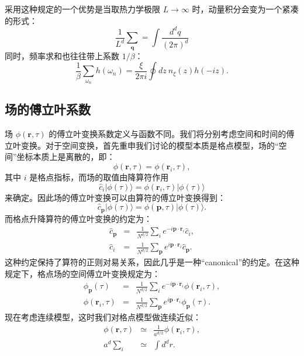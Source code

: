 \documentclass[UTF8]{ctexart}
\begin{document}
采用这种规定的一个优势是当取热力学极限 $L \rightarrow \infty$ 时，动量积分会变为一个紧凑的形式：
\begin{equation}
	\frac{1}{L^d}\sum_{\bm q} = \int \frac{d^d q}{(2\pi)^d}
\end{equation}
同时，频率求和也往往带上系数 $1/\beta$：
\begin{equation}
	\frac{1}{\beta}\sum_{\omega_n}h(\omega_n)
	= \frac{\xi}{2\pi i} \oint dz\ n_{\xi}(z) h(-iz).
\end{equation}




\subsection*{场的傅立叶系数}
\noindent 
场 $\phi(\bm r,\tau)$ 的傅立叶变换系数定义与函数不同。我们将分别考虑空间和时间的傅立叶变换。对于空间变换，首先重申我们讨论的模型本质是格点模型，场的“空间”坐标本质上是离散的，即：
\begin{equation}
	\phi(\bm r, \tau) = \phi(\bm r_i,\tau),
\end{equation}
其中 $i$ 是格点指标，而场的取值由降算符作用
\begin{equation}
	\hat c_i |\phi(\tau) \rangle = \phi(\bm r_i,\tau) |\phi(\tau) \rangle
\end{equation}
来确定。因此场的傅立叶变换可以由算符的傅立叶变换得到：
\begin{equation}
	\hat c_{\bm p}|\phi(\tau) \rangle = \phi(\bm p,\tau) |\phi(\tau) \rangle.
\end{equation}
而格点升降算符的傅立叶变换的约定为：
\begin{eqnarray}
	\hat c_{\bm p} &=& \frac{1}{N^{d/2}}\sum_i e^{-i\bm p\cdot \bm r_i} \hat c_i, \\
	\hat c_i &=& \frac{1}{N^{d/2}}\sum_{\bm p} e^{i\bm p\cdot \bm r_i} \hat c_{\bm p}.
\end{eqnarray}
这种约定保持了算符的正则对易关系，因此几乎是一种“canonical”的约定。在这种规定下，格点场的空间傅立叶变换规定为：
\begin{eqnarray}
	\phi_{\bm p}(\tau) &=& \frac{1}{N^{d/2}}\sum_i e^{-i\bm p\cdot \bm r_i} \phi(\bm r_i,\tau), \\
	\phi(\bm r_i,\tau) &=& \frac{1}{N^{d/2}}\sum_{\bm p} e^{i\bm p\cdot \bm r_i} \phi_{\bm p}(\tau).
\end{eqnarray}
现在考虑连续模型，这时我们对格点模型做连续近似：
\begin{eqnarray}
	\phi(\bm r,\tau) &\simeq & \frac{1}{a^{d/2}}\phi(\bm r_i,\tau), \\
	a^d \sum_i &\simeq & \int d^d r.
\end{eqnarray}
\end{document}
